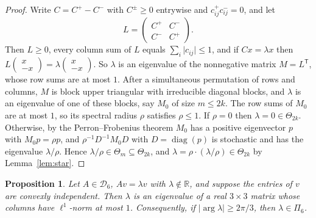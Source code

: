 \documentclass[11pt]{amsart}
\newtheorem{proposition}[theorem]{Proposition}
\theoremstyle{definition}
\theoremstyle{remark}
\newcommand{\R}{\mathbb{R}}
\newcommand{\cD}{\mathcal{D}}
\begin{document}
\begin{proof}
Write $C=C^+-C^-$ with $C^\pm\ge0$ entrywise and $c^+_{ij}c^-_{ij}=0$, and let
\[
L=\begin{pmatrix}C^+&C^-\\ C^-&C^+\end{pmatrix}.
\]
Then $L\ge0$, every column sum of $L$ equals $\sum_i\lvert c_{ij}\rvert\le1$, and if $Cx=\lambda x$ then $L\left(\begin{smallmatrix}x\\-x\end{smallmatrix}\right)=\lambda\left(\begin{smallmatrix}x\\-x\end{smallmatrix}\right)$. So $\lambda$ is an eigenvalue of the nonnegative matrix $M=L^{\mathsf T}$, whose row sums are at most $1$. After a simultaneous permutation of rows and columns, $M$ is block upper triangular with irreducible diagonal blocks, and $\lambda$ is an eigenvalue of one of these blocks, say $M_0$ of size $m\le2k$. The row sums of $M_0$ are at most $1$, so its spectral radius $\rho$ satisfies $\rho\le1$. If $\rho=0$ then $\lambda=0\in\Theta_{2k}$. Otherwise, by the Perron--Frobenius theorem $M_0$ has a positive eigenvector $p$ with $M_0p=\rho p$, and $\rho^{-1}D^{-1}M_0D$ with $D=\operatorname{diag}(p)$ is stochastic and has the eigenvalue $\lambda/\rho$. Hence $\lambda/\rho\in\Theta_m\subseteq\Theta_{2k}$, and $\lambda=\rho\cdot(\lambda/\rho)\in\Theta_{2k}$ by Lemma~\ref{lem:star}.
\end{proof}

\begin{proposition}\label{prop:K3}
Let $A\in\cD_6$, $Av=\lambda v$ with $\lambda\notin\R$, and suppose the entries of $v$ are convexly independent. Then $\lambda$ is an eigenvalue of a real $3\times3$ matrix whose columns have $\ell^1$-norm at most $1$. Consequently, if $\lvert\arg\lambda\rvert\ge2\pi/3$, then $\lambda\in\Pi_6$.
\end{proposition}
\end{document}
